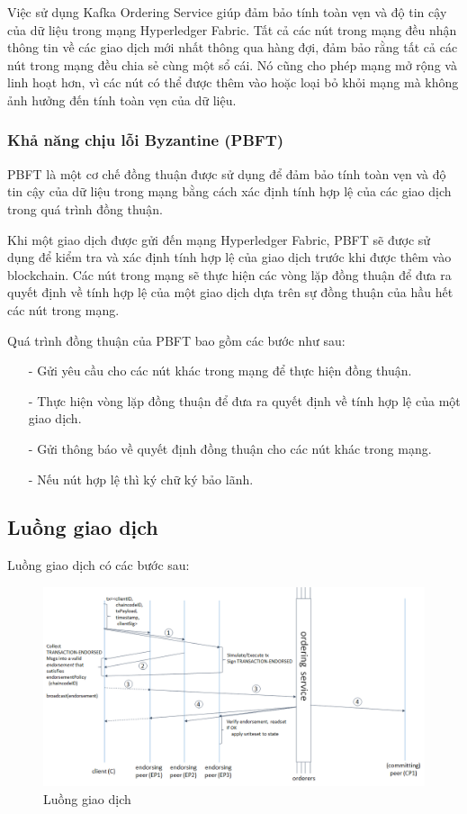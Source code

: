 Việc sử dụng Kafka Ordering Service giúp đảm bảo tính toàn vẹn và độ tin cậy của dữ 
liệu trong mạng Hyperledger Fabric. Tất cả các nút trong mạng đều nhận thông tin về 
các giao dịch mới nhất thông qua hàng đợi, đảm bảo rằng tất cả các nút trong mạng 
đều chia sẻ cùng một sổ cái. Nó cũng cho phép mạng mở rộng và linh hoạt hơn, vì các 
nút có thể được thêm vào hoặc loại bỏ khỏi mạng mà không ảnh hưởng đến tính toàn vẹn 
của dữ liệu.

\subsubsection{Khả năng chịu lỗi Byzantine (PBFT)}
PBFT là một cơ chế đồng thuận được sử dụng để đảm bảo tính toàn vẹn và độ tin cậy 
của dữ liệu trong mạng bằng cách xác định tính hợp lệ của các giao dịch trong quá 
trình đồng thuận.

Khi một giao dịch được gửi đến mạng Hyperledger Fabric, PBFT sẽ được sử dụng để 
kiểm tra và xác định tính hợp lệ của giao dịch trước khi được thêm vào blockchain. 
Các nút trong mạng sẽ thực hiện các vòng lặp đồng thuận để đưa ra quyết định về tính 
hợp lệ của một giao dịch dựa trên sự đồng thuận của hầu hết các nút trong mạng.

Quá trình đồng thuận của PBFT bao gồm các bước như sau:
\begin{itemize}
    \item[-] Gửi yêu cầu cho các nút khác trong mạng để thực hiện đồng thuận.
    \item[-] Thực hiện vòng lặp đồng thuận để đưa ra quyết định về tính hợp lệ của một giao dịch.
    \item[-] Gửi thông báo về quyết định đồng thuận cho các nút khác trong mạng.
    \item[-] Nếu nút hợp lệ thì ký chữ ký bảo lãnh.  
\end{itemize}

\subsection{Luồng giao dịch}

Luồng giao dịch có các bước sau:
\begin{figure}[h]
    \centering
    \includegraphics[width=1\textwidth]{images/flow-4.png}
    \caption{Luồng giao dịch }
\end{figure}


